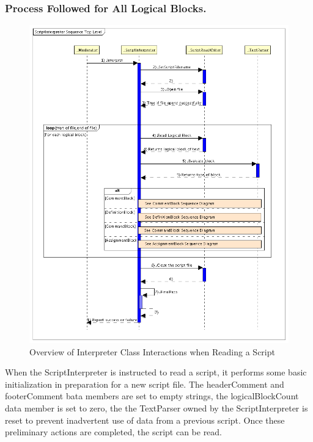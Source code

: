 \subsubsection{Process Followed for All Logical Blocks.}

\begin{figure}
\begin{center}
\includegraphics[400,491]{Images/ScriptInterpreterSequenceTopLevel.png}
\caption{\label{figure:InterpreterReadInteractionsTopLevel}Overview of Interpreter Class
Interactions when Reading a Script}
\end{center}
\end{figure}

When the ScriptInterpreter is instructed to read a script, it performs some basic
initialization in preparation for a new script file.  The headerComment and footerComment bata
members are set to empty strings, the logicalBlockCount data member is set to zero, the the
TextParser owned by the ScriptInterpreter is reset to prevent inadvertent use of data from a
previous script.  Once these preliminary actions are completed, the script can be read.

